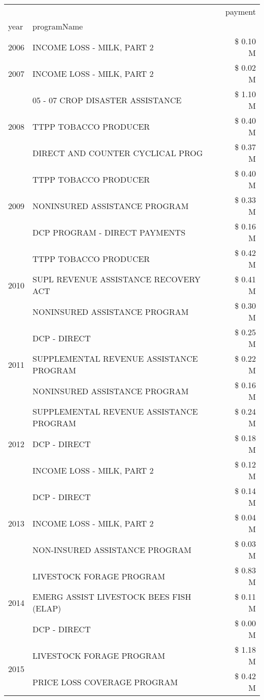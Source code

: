 \begin{tabular}{llr}
\toprule
 &  & payment \\
year & programName &  \\
\midrule
2006 & INCOME LOSS - MILK, PART 2 & \$ 0.10 M \\
\cline{1-3}
2007 & INCOME LOSS - MILK, PART 2 & \$ 0.02 M \\
\cline{1-3}
\multirow[t]{3}{*}{2008} & 05 - 07 CROP DISASTER ASSISTANCE & \$ 1.10 M \\
 & TTPP TOBACCO PRODUCER & \$ 0.40 M \\
 & DIRECT AND COUNTER CYCLICAL PROG & \$ 0.37 M \\
\cline{1-3}
\multirow[t]{3}{*}{2009} & TTPP TOBACCO PRODUCER & \$ 0.40 M \\
 & NONINSURED ASSISTANCE PROGRAM & \$ 0.33 M \\
 & DCP PROGRAM - DIRECT PAYMENTS & \$ 0.16 M \\
\cline{1-3}
\multirow[t]{3}{*}{2010} & TTPP TOBACCO PRODUCER & \$ 0.42 M \\
 & SUPL REVENUE ASSISTANCE RECOVERY ACT & \$ 0.41 M \\
 & NONINSURED ASSISTANCE PROGRAM & \$ 0.30 M \\
\cline{1-3}
\multirow[t]{3}{*}{2011} & DCP - DIRECT & \$ 0.25 M \\
 & SUPPLEMENTAL REVENUE ASSISTANCE PROGRAM & \$ 0.22 M \\
 & NONINSURED ASSISTANCE PROGRAM & \$ 0.16 M \\
\cline{1-3}
\multirow[t]{3}{*}{2012} & SUPPLEMENTAL REVENUE ASSISTANCE PROGRAM & \$ 0.24 M \\
 & DCP - DIRECT & \$ 0.18 M \\
 & INCOME LOSS - MILK, PART 2 & \$ 0.12 M \\
\cline{1-3}
\multirow[t]{3}{*}{2013} & DCP - DIRECT & \$ 0.14 M \\
 & INCOME LOSS - MILK, PART 2 & \$ 0.04 M \\
 & NON-INSURED ASSISTANCE PROGRAM & \$ 0.03 M \\
\cline{1-3}
\multirow[t]{3}{*}{2014} & LIVESTOCK FORAGE PROGRAM & \$ 0.83 M \\
 & EMERG ASSIST LIVESTOCK BEES FISH (ELAP) & \$ 0.11 M \\
 & DCP - DIRECT & \$ 0.00 M \\
\cline{1-3}
\multirow[t]{3}{*}{2015} & LIVESTOCK FORAGE PROGRAM & \$ 1.18 M \\
 & PRICE LOSS COVERAGE PROGRAM & \$ 0.42 M \\

\end{tabular}
